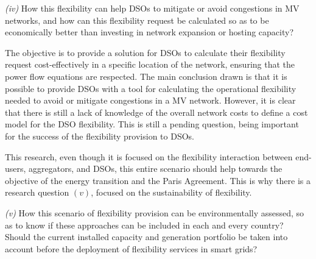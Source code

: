 
\begin{tcolorbox}
\textit{(iv)} How this flexibility can help DSOs to mitigate or avoid congestions in MV networks, and how can this flexibility request be calculated so as to be economically better than investing in network expansion or hosting capacity?
\end{tcolorbox}

The objective is to provide a solution for DSOs to calculate their flexibility request cost-effectively in a specific location of the network, ensuring that the power flow equations are respected. The main conclusion drawn is that it is possible to provide DSOs with a tool for calculating the operational flexibility needed to avoid or mitigate congestions in a MV network. However, it is clear that there is still a lack of knowledge of the overall network costs to define a cost model for the DSO flexibility. This is still a pending question, being important for the success of the flexibility provision to DSOs.

This research, even though it is focused on the flexibility interaction between end-users, aggregators, and DSOs, this entire scenario should help towards the objective of the energy transition and the Paris Agreement. This is why there is a research question $(v)$, focused on the sustainability of flexibility.


\begin{tcolorbox}
\textit{(v)} How this scenario of flexibility provision can be environmentally assessed, so as to know if these approaches can be included in each and every country? Should the current installed capacity and generation portfolio be taken into account before the deployment of flexibility services in smart grids?
\end{tcolorbox}

